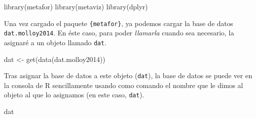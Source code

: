 \documentclass[
  bookmarksnumbered]{article}
\newenvironment{Shaded}{\begin{snugshade}}{\end{snugshade}}
\newcommand{\FunctionTok}[1]{\textcolor[rgb]{0.39,0.29,0.61}{#1}}
\newcommand{\NormalTok}[1]{\textcolor[rgb]{0.12,0.11,0.11}{#1}}
\newcommand{\OtherTok}[1]{\textcolor[rgb]{0.00,0.43,0.16}{#1}}
\begin{document}
\begin{Shaded}
\begin{Highlighting}[]
\FunctionTok{library}\NormalTok{(metafor)}
\FunctionTok{library}\NormalTok{(metaviz)}
\FunctionTok{library}\NormalTok{(dplyr)}
\end{Highlighting}
\end{Shaded}

Una vez cargado el paquete \texttt{\{metafor\}}, ya podemos cargar la base de datos \texttt{dat.molloy2014}. En éste caso, para poder \emph{llamarla} cuando sea necesario, la asignaré a un objeto llamado \texttt{dat}.

\begin{Shaded}
\begin{Highlighting}[]
\NormalTok{dat }\OtherTok{\textless{}{-}} \FunctionTok{get}\NormalTok{(}\FunctionTok{data}\NormalTok{(dat.molloy2014))}
\end{Highlighting}
\end{Shaded}

Tras asignar la base de datos a este objeto (\texttt{dat}), la base de datos se puede ver en la consola de R sencillamente usando como comando el nombre que le dimos al objeto al que lo asignamos (en este caso, \texttt{dat}).

\begin{Shaded}
\begin{Highlighting}[]
\NormalTok{dat}
\end{Highlighting}
\end{Shaded}
\end{document}
